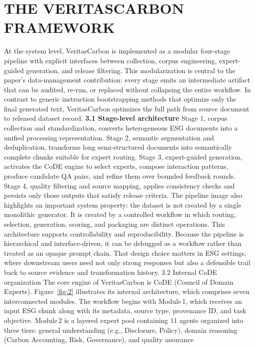 \documentclass[9pt,twocolumn]{extarticle}
\begin{document}
\section{THE VERITASCARBON FRAMEWORK}
At the system level, VeritasCarbon is implemented as a modular
four-stage pipeline with explicit interfaces between collection, corpus
engineering, expert-guided generation, and release filtering. This
modularization is central to the paper's data-management contribution:
every stage emits an intermediate artifact that can be audited, re-run,
or replaced without collapsing the entire workflow. In contrast to
generic instruction bootstrapping methods that optimize only the final
generated text, VeritasCarbon optimizes the full path from source
document to released dataset record.
\textbf{3.1 Stage-level architecture}
Stage 1, corpus collection and standardization, converts heterogeneous
ESG documents into a unified processing representation. Stage 2,
semantic segmentation and deduplication, transforms long semi-structured
documents into semantically complete chunks suitable for expert routing.
Stage 3, expert-guided generation, activates the CoDE engine to select
experts, compose interaction patterns, produce candidate QA pairs, and
refine them over bounded feedback rounds. Stage 4, quality filtering and
source mapping, applies consistency checks and persists only those
outputs that satisfy release criteria. The pipeline image also
highlights an important system property: the dataset is not created by a
single monolithic generator. It is created by a controlled workflow in
which routing, selection, generation, scoring, and packaging are
distinct operations.
This architecture supports controllability and reproducibility. Because
the pipeline is hierarchical and interface-driven, it can be debugged as
a workflow rather than treated as an opaque prompt chain. That design
choice matters in ESG settings, where downstream users need not only
strong responses but also a defensible trail back to source evidence and
transformation history.
3.2 Internal CoDE organization
The core engine of VeritasCarbon is CoDE (Council of Domain Experts).
Figure~\ref{fig:2} illustrates its internal
architecture, which comprises seven interconnected modules.
The workflow begins with Module\,1, which receives an input ESG chunk
along with its metadata, source type, provenance ID, and task objective.
Module\,2 is a layered expert pool containing 11 agents organized into
three tiers: general understanding (e.g., Disclosure, Policy), domain
reasoning (Carbon Accounting, Risk, Governance), and quality assurance
\end{document}
